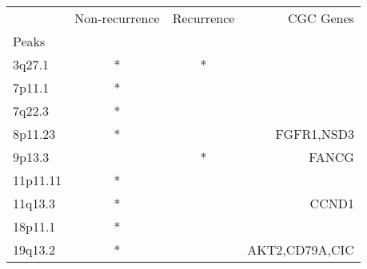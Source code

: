 \begin{tabular}{lccr}
\toprule
{} & Non-recurrence & Recurrence &       CGC Genes \\
Peaks    &                &            &                 \\
\midrule
3q27.1   &              * &          * &                 \\
7p11.1   &              * &            &                 \\
7q22.3   &              * &            &                 \\
8p11.23  &              * &            &      FGFR1,NSD3 \\
9p13.3   &                &          * &           FANCG \\
11p11.11 &              * &            &                 \\
11q13.3  &              * &            &           CCND1 \\
18p11.1  &              * &            &                 \\
19q13.2  &              * &            &  AKT2,CD79A,CIC \\
\bottomrule
\end{tabular}
